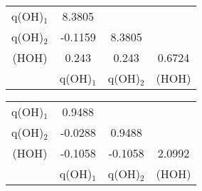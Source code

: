 \documentclass[12pt]{article}
\begin{document}
\begin{minipage}{0.5\linewidth}
\begin{tabular}{cccc}
\toprule
q(OH)$_1$ & 8.3805 & &  \\
q(OH)$_2$ & -0.1159 & 8.3805 & \\
(HOH) & 0.243 & 0.243 & 0.6724 \\
      & q(OH)$_1$ & q(OH)$_2$ & (HOH) \\
\bottomrule
\end{tabular}
\end{minipage}
\begin{minipage}{0.5\linewidth}
\begin{tabular}{cccc}
\toprule
q(OH)$_1$ & 0.9488 & &  \\
q(OH)$_2$ & -0.0288 & 0.9488 & \\
(HOH) & -0.1058 & -0.1058 & 2.0992 \\
      & q(OH)$_1$ & q(OH)$_2$ & (HOH) \\
\bottomrule
\end{tabular}
\end{minipage}

\newpage
\end{document}
